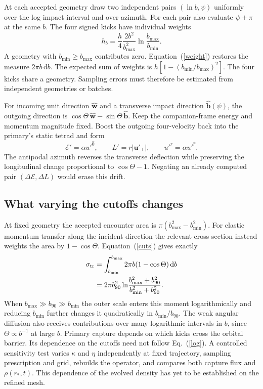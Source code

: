 \documentclass[aps,prd,reprint,amsmath,amssymb,nofootinbib]{revtex4-2}
\newcommand{\E}{\mathcal E}
\newcommand{\dd}{\mathrm{d}}
\begin{document}
At each accepted geometry draw two independent pairs $(\ln b,\psi)$ uniformly over the log impact interval and over azimuth. For each pair also evaluate $\psi+\pi$ at the same $b$. The four signed kicks have individual weights
\begin{equation}
 h_b=\frac h4\frac{2b^2}{b_{\max}^2}
             \ln\frac{b_{\max}}{b_{\min}} .
 \label{weight}
\end{equation}
A geometry with $b_{\min}\ge b_{\max}$ contributes zero. Equation~(\ref{weight}) restores the measure $2\pi b\,\dd b$. The expected sum of weights is $h[1-(b_{\min}/b_{\max})^2]$. The four kicks share a geometry. Sampling errors must therefore be estimated from independent geometries or batches.

For incoming unit direction $\hat{\boldsymbol w}$ and a transverse impact direction $\hat{\boldsymbol b}(\psi)$, the outgoing direction is $\cos\Theta\,\hat{\boldsymbol w}-\sin\Theta\,\hat{\boldsymbol b}$. Keep the companion-frame energy and momentum magnitude fixed. Boost the outgoing four-velocity back into the primary's static tetrad and form
\begin{equation}
 \E'=\alpha u'^{\hat0},\qquad L'=r|\boldsymbol u'_{\perp}|,\qquad
 u'^r=\alpha u'^{\hat r}.
 \label{kick}
\end{equation}
The antipodal azimuth reverses the transverse deflection while preserving the longitudinal change proportional to $\cos\Theta-1$. Negating an already computed pair $(\Delta\E,\Delta L)$ would erase this drift.

\subsection{What varying the cutoffs changes}
At fixed geometry the accepted encounter area is $\pi(b_{\max}^2-b_{\min}^2)$. For elastic momentum transfer along the incident direction the relevant cross section instead weights the area by $1-\cos\Theta$. Equation~(\ref{cuts}) gives exactly
\begin{align}
 \sigma_{\rm tr}&=\int_{b_{\min}}^{b_{\max}}2\pi b(1-\cos\Theta)\,\dd b
 \nonumber\\
 &=2\pi b_{90}^2
 \ln\!\frac{b_{\max}^2+b_{90}^2}{b_{\min}^2+b_{90}^2}.
 \label{log}
\end{align}
When $b_{\max}\gg b_{90}\gg b_{\min}$ the outer scale enters this moment logarithmically and reducing $b_{\min}$ further changes it quadratically in $b_{\min}/b_{90}$. The weak angular diffusion also receives contributions over many logarithmic intervals in $b$, since $\Theta\propto b^{-1}$ at large $b$. Primary capture depends on which kicks cross the orbital barrier. Its dependence on the cutoffs need not follow Eq.~(\ref{log}). A controlled sensitivity test varies $\kappa$ and $\eta$ independently at fixed trajectory, sampling prescription and grid, rebuilds the operator, and compares both capture flux and $\rho(r_*,t)$. This dependence of the evolved density has yet to be established on the refined mesh.
\end{document}
